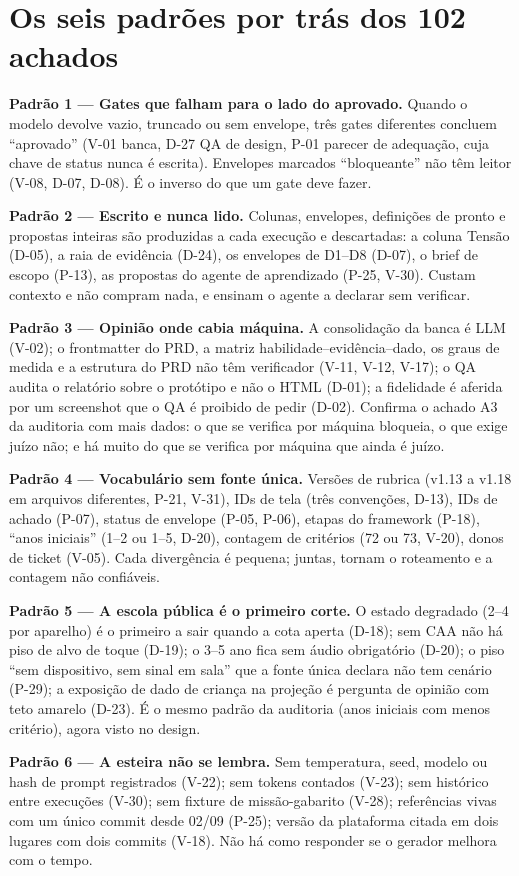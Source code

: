 \documentclass[11pt,a4paper]{article}
\begin{document}
\section{Os seis padrões por trás dos 102 achados}
\label{sec:padroes}

\begin{tesebox}
\textbf{Padrão 1 --- Gates que falham para o lado do aprovado.} Quando o modelo devolve vazio,
truncado ou sem envelope, três gates diferentes concluem ``aprovado'' (V-01 banca, D-27 QA de design,
P-01 parecer de adequação, cuja chave de status nunca é escrita). Envelopes marcados ``bloqueante''
não têm leitor (V-08, D-07, D-08). É o inverso do que um gate deve fazer.

\textbf{Padrão 2 --- Escrito e nunca lido.} Colunas, envelopes, definições de pronto e propostas
inteiras são produzidas a cada execução e descartadas: a coluna Tensão (D-05), a raia de evidência
(D-24), os envelopes de D1--D8 (D-07), o brief de escopo (P-13), as propostas do agente de
aprendizado (P-25, V-30). Custam contexto e não compram nada, e ensinam o agente a declarar sem
verificar.

\textbf{Padrão 3 --- Opinião onde cabia máquina.} A consolidação da banca é LLM (V-02); o
frontmatter do PRD, a matriz habilidade--evidência--dado, os graus de medida e a estrutura do PRD não
têm verificador (V-11, V-12, V-17); o QA audita o relatório sobre o protótipo e não o HTML (D-01); a
fidelidade é aferida por um screenshot que o QA é proibido de pedir (D-02). Confirma o achado A3 da
auditoria com mais dados: o que se verifica por máquina bloqueia, o que exige juízo não; e há muito
do que se verifica por máquina que ainda é juízo.

\textbf{Padrão 4 --- Vocabulário sem fonte única.} Versões de rubrica (v1.13 a v1.18 em arquivos
diferentes, P-21, V-31), IDs de tela (três convenções, D-13), IDs de achado (P-07), status de
envelope (P-05, P-06), etapas do framework (P-18), ``anos iniciais'' (1\textordmasculine{}--2\textordmasculine{}
ou 1\textordmasculine{}--5\textordmasculine{}, D-20), contagem de critérios (72 ou 73, V-20), donos de
ticket (V-05). Cada divergência é pequena; juntas, tornam o roteamento e a contagem não confiáveis.

\textbf{Padrão 5 --- A escola pública é o primeiro corte.} O estado degradado (2--4 por aparelho) é
o primeiro a sair quando a cota aperta (D-18); sem CAA não há piso de alvo de toque (D-19); o
3\textordmasculine{}--5\textordmasculine{} ano fica sem áudio obrigatório (D-20); o piso ``sem
dispositivo, sem sinal em sala'' que a fonte única declara não tem cenário (P-29); a exposição de
dado de criança na projeção é pergunta de opinião com teto amarelo (D-23). É o mesmo padrão da
auditoria (anos iniciais com menos critério), agora visto no design.

\textbf{Padrão 6 --- A esteira não se lembra.} Sem temperatura, seed, modelo ou hash de prompt
registrados (V-22); sem tokens contados (V-23); sem histórico entre execuções (V-30); sem fixture de
missão-gabarito (V-28); referências vivas com um único commit desde 02/09 (P-25); versão da
plataforma citada em dois lugares com dois commits (V-18). Não há como responder se o gerador
melhora com o tempo.
\end{tesebox}
\end{document}

